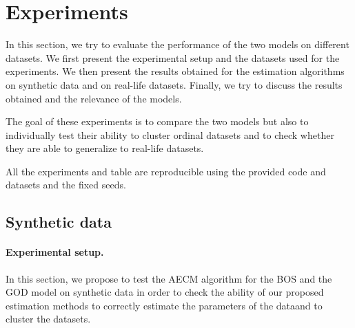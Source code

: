 \section{Experiments}
In this section, we try to evaluate the performance of the two models on different datasets. We first present the experimental setup and the datasets used for the experiments. We then present the results obtained for the estimation algorithms on synthetic data and on real-life datasets. Finally, we try to discuss the results obtained and the relevance of the models. 

The goal of these experiments is to compare the two models but also to individually test their ability to cluster ordinal datasets and to check whether they are able to generalize to real-life datasets.

All the experiments and table are reproducible using the provided code and datasets and the fixed seeds.

\subsection{Synthetic data}
\paragraph{Experimental setup.}
In this section, we propose to test the AECM algorithm for the BOS and the GOD model on synthetic data in order to check the ability of our proposed estimation methods to correctly estimate the parameters of the dataand to cluster the datasets. 

